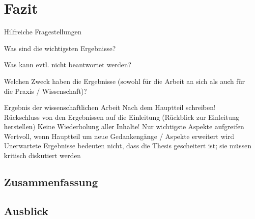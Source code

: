 
\chapter{Fazit}
Hilfreiche Fragestellungen
\begin{description}
\item Was sind die wichtigsten Ergebnisse?
\item Was kann evtl. nicht beantwortet werden?
\item Welchen Zweck haben die Ergebnisse (sowohl für die Arbeit an sich als
auch für die Praxis / Wissenschaft)?
\end{description}

Ergebnis der wissenschaftlichen Arbeit
Nach dem Hauptteil schreiben!
Rückschluss von den Ergebnissen auf die Einleitung (Rückblick zur Einleitung herstellen)
Keine Wiederholung aller Inhalte! Nur wichtigste Aspekte aufgreifen
Wertvoll, wenn Hauptteil um neue Gedankengänge / Aspekte erweitert wird
Unerwartete Ergebnisse bedeuten nicht, dass die Thesis gescheitert ist; sie müssen kritisch diskutiert werden

\section{Zusammenfassung}
\section{Ausblick}